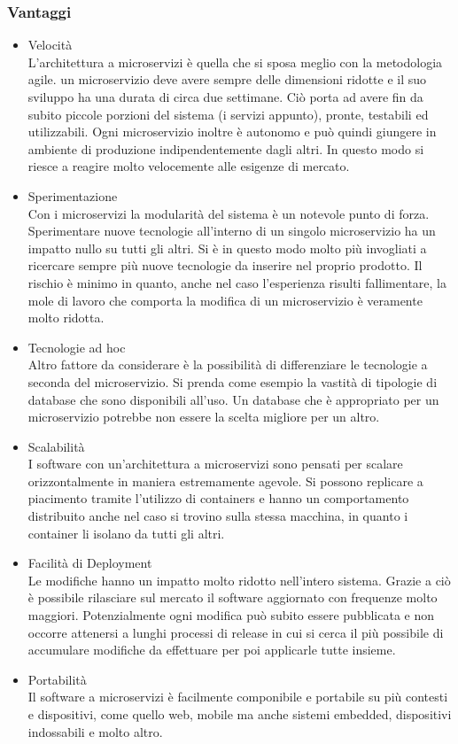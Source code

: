 \subsubsection{Vantaggi}
\begin{itemize}
	\item  Velocità \\
	L'architettura a microservizi è quella che si sposa meglio con la metodologia agile. un microservizio deve avere sempre delle dimensioni ridotte e il suo sviluppo ha una durata di circa due settimane. Ciò porta ad avere fin da subito piccole porzioni del sistema (i servizi appunto), pronte, testabili ed utilizzabili. Ogni microservizio inoltre è autonomo e può quindi giungere in ambiente di produzione indipendentemente dagli altri. In questo modo si riesce a reagire molto velocemente alle esigenze di mercato.
	
	\item Sperimentazione \\
	Con i microservizi la modularità del sistema è un notevole punto di forza. Sperimentare nuove tecnologie all'interno di un singolo microservizio ha un impatto nullo su tutti gli altri. Si è in questo modo molto più invogliati a ricercare sempre più nuove tecnologie da inserire nel proprio prodotto. Il rischio è minimo in quanto, anche nel caso l'esperienza risulti fallimentare, la mole di lavoro che comporta la modifica di un microservizio è veramente molto ridotta.
	
	\item Tecnologie ad hoc \\
	Altro fattore da considerare è la possibilità di differenziare le tecnologie a seconda del microservizio. Si prenda come esempio la vastità di tipologie di database che sono disponibili all'uso. Un database che è appropriato per un microservizio potrebbe non essere la scelta migliore per un altro. 
	
	\item Scalabilità \\
	I software con un'architettura a microservizi sono pensati per scalare orizzontalmente in maniera estremamente agevole. Si possono replicare a piacimento tramite l'utilizzo di containers e hanno un comportamento distribuito anche nel caso si trovino sulla stessa macchina, in quanto i container li isolano da tutti gli altri.
	
	\item Facilità di Deployment \\
	Le modifiche hanno un impatto molto ridotto nell'intero sistema. Grazie a ciò è possibile rilasciare sul mercato il software aggiornato con frequenze molto maggiori. Potenzialmente ogni modifica può subito essere pubblicata e non occorre attenersi a lunghi processi di release in cui si cerca il più possibile di accumulare modifiche da effettuare per poi applicarle tutte insieme.
	
	\item Portabilità \\
	Il software a microservizi è facilmente componibile e portabile su più contesti e dispositivi, come quello web, mobile ma anche sistemi embedded, dispositivi indossabili e molto altro.	
\end{itemize}

